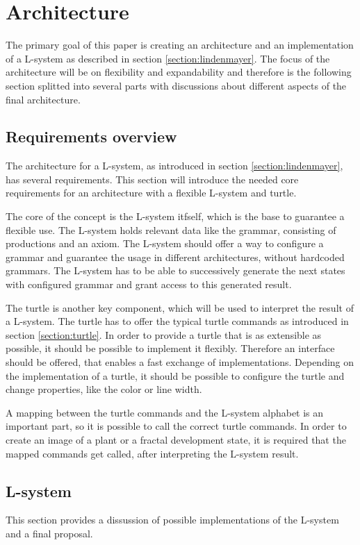 \documentclass[english]{cpp-hmwk}
\begin{document}
\clearpage
\section{Architecture}
The primary goal of this paper is creating an architecture and an implementation of a L-system as described in section \ref{section:lindenmayer}. The focus of the architecture will be on flexibility and expandability and therefore is the following section splitted into several parts with discussions about different aspects of the final architecture.

\subsection{Requirements overview}
The architecture for a L-system, as introduced in section \ref{section:lindenmayer}, has several requirements. This section will introduce the needed core requirements for an architecture with a flexible L-system and turtle.

\medskip
\noindent The core of the concept is the L-system itfself, which is the base to guarantee a flexible use. The L-system holds relevant data like the grammar, consisting of productions and an axiom. The L-system should offer a way to configure a grammar and guarantee the usage in different architectures, without hardcoded grammars. The L-system has to be able to successively generate the next states with configured grammar and grant access to this generated result.

\medskip

\noindent The turtle is another key component, which will be used to interpret the result of a L-system. The turtle has to offer the typical turtle commands as introduced in section \ref{section:turtle}. In order to provide a turtle that is as extensible as possible, it should be possible to implement it flexibly. Therefore an interface should be offered, that enables a fast exchange of implementations. Depending on the implementation of a turtle, it should be possible to configure the turtle and change properties, like the color or line width.

\medskip
\noindent A mapping between the turtle commands and the L-system alphabet is an important part, so it is possible to call the correct turtle commands. In order to create an image of a plant or a fractal development state, it is required that the mapped commands get called, after interpreting the L-system result.


\subsection{L-system}
\label{section:lsystem_discussion}
This section provides a dissussion of possible implementations of the L-system and a final proposal.
\end{document}
